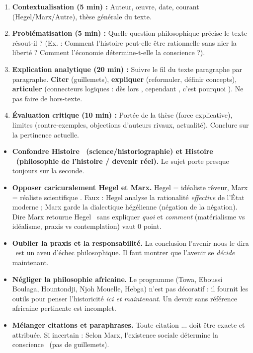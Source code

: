 \documentclass[11pt]{article}
\newcommand{\cle}[1]{{\popxbold\color{popdark}#1}}
\begin{document}
\begin{methode}
\begin{enumerate}
\item \textbf{Contextualisation (5 min) :} Auteur, œuvre, date, courant (Hegel/Marx/Autre), thèse générale du texte.
\item \textbf{Problématisation (5 min) :} Quelle question philosophique précise le texte résout-il ? (Ex. : Comment l'histoire peut-elle être rationnelle sans nier la liberté ? Comment l'économie détermine-t-elle la conscience ?).
\item \textbf{Explication analytique (20 min) :} Suivre le fil du texte paragraphe par paragraphe. \textbf{Citer} (guillemets), \textbf{expliquer} (reformuler, définir concepts), \textbf{articuler} (connecteurs logiques : \guillemotleft dès lors \guillemotright, \guillemotleft cependant \guillemotright, \guillemotleft c'est pourquoi \guillemotright). Ne pas faire de hors-texte.
\item \textbf{Évaluation critique (10 min) :} Portée de la thèse (force explicative), limites (contre-exemples, objections d'auteurs rivaux, actualité). Conclure sur la pertinence actuelle.
\end{enumerate}
\end{methode}

\begin{attention}
\begin{itemize}
\item \textbf{Confondre \guillemotleft Histoire \guillemotright\ (science/historiographie) et \guillemotleft Histoire \guillemotright\ (philosophie de l'histoire / devenir réel).} Le sujet porte presque toujours sur la seconde.
\item \textbf{Opposer caricuralement Hegel et Marx.} \guillemotleft Hegel = idéaliste rêveur, Marx = réaliste scientifique \guillemotright. Faux : Hegel analyse la rationalité \emph{effective} de l'État moderne ; Marx garde la dialectique hégélienne (négation de la négation). Dire \guillemotleft Marx retourne Hegel \guillemotright\ sans expliquer \emph{quoi} et \emph{comment} (matérialisme vs idéalisme, praxis vs contemplation) vaut 0 point.
\item \textbf{Oublier la \cle{praxis} et la \cle{responsabilité}.} La conclusion \guillemotleft l'avenir nous le dira \guillemotright\ est un aveu d'échec philosophique. Il faut montrer que l'avenir se \emph{décide} maintenant.
\item \textbf{Négliger la philosophie africaine.} Le programme (Towa, Eboussi Boulaga, Hountondji, Njoh Mouelle, Hebga) n'est pas décoratif : il fournit les outils pour penser l'historicité \emph{ici et maintenant}. Un devoir sans référence africaine pertinente est incomplet.
\item \textbf{Mélanger citations et paraphrases.} Toute citation \guillemotleft ... \guillemotright doit être exacte et attribuée. Si incertain : \guillemotleft Selon Marx, l'existence sociale détermine la conscience \guillemotright\ (pas de guillemets).
\end{itemize}
\end{attention}
\end{document}

